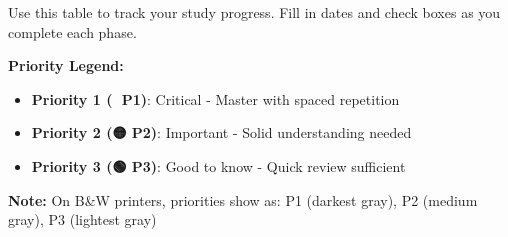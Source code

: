 \documentclass[10pt]{article}
\begin{document}
Use this table to track your study progress. Fill in dates and check boxes as you complete each phase.

\textbf{Priority Legend:}
\begin{itemize}
\item \colorbox{priority1}{\textbf{Priority 1 (🔴 P1)}}: Critical - Master with spaced repetition
\item \colorbox{priority2}{\textbf{Priority 2 (🟡 P2)}}: Important - Solid understanding needed
\item \colorbox{priority3}{\textbf{Priority 3 (🟢 P3)}}: Good to know - Quick review sufficient
\end{itemize}

\textbf{Note:} On B\&W printers, priorities show as: P1 (darkest gray), P2 (medium gray), P3 (lightest gray)
\end{document}

